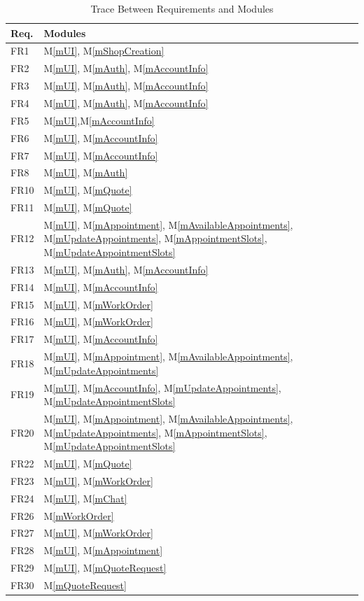 \documentclass[12pt, titlepage]{article}
\newcommand{\mref}[1]{M\ref{#1}}
\begin{document}
\begin{table}[H]
\centering
\begin{tabular}{p{} p{}}
\toprule
\textbf{Req.} & \textbf{Modules}\\
\midrule
FR1 & \mref{mUI}, \mref{mShopCreation}\\
FR2 & \mref{mUI}, \mref{mAuth}, \mref{mAccountInfo}\\
FR3 & \mref{mUI}, \mref{mAuth}, \mref{mAccountInfo}\\
FR4 & \mref{mUI}, \mref{mAuth}, \mref{mAccountInfo}\\
FR5 & \mref{mUI},\mref{mAccountInfo}\\
FR6 & \mref{mUI}, \mref{mAccountInfo}\\
FR7 & \mref{mUI}, \mref{mAccountInfo}\\
FR8 & \mref{mUI}, \mref{mAuth}\\
FR10 & \mref{mUI}, \mref{mQuote}\\
FR11 & \mref{mUI}, \mref{mQuote}\\
FR12 & \mref{mUI}, \mref{mAppointment}, \mref{mAvailableAppointments}, \mref{mUpdateAppointments}, \mref{mAppointmentSlots}, \mref{mUpdateAppointmentSlots}\\
FR13 & \mref{mUI}, \mref{mAuth}, \mref{mAccountInfo}\\
FR14 & \mref{mUI}, \mref{mAccountInfo}\\
FR15 & \mref{mUI}, \mref{mWorkOrder}\\
FR16 & \mref{mUI}, \mref{mWorkOrder}\\
FR17 & \mref{mUI}, \mref{mAccountInfo}\\
FR18 & \mref{mUI}, \mref{mAppointment}, \mref{mAvailableAppointments}, \mref{mUpdateAppointments}\\
FR19 & \mref{mUI}, \mref{mAccountInfo}, \mref{mUpdateAppointments}, \mref{mUpdateAppointmentSlots}\\
FR20 & \mref{mUI}, \mref{mAppointment}, \mref{mAvailableAppointments}, \mref{mUpdateAppointments}, \mref{mAppointmentSlots}, \mref{mUpdateAppointmentSlots}\\
FR22 & \mref{mUI}, \mref{mQuote}\\
FR23 & \mref{mUI}, \mref{mWorkOrder}\\
FR24 & \mref{mUI}, \mref{mChat}\\
FR26 & \mref{mWorkOrder}\\
FR27 & \mref{mUI}, \mref{mWorkOrder}\\
FR28 & \mref{mUI}, \mref{mAppointment}\\
FR29 & \mref{mUI}, \mref{mQuoteRequest}\\
FR30 & \mref{mQuoteRequest}\\
\bottomrule
\end{tabular}
\caption{Trace Between Requirements and Modules}
\label{TblRT}
\end{table}
\end{document}
